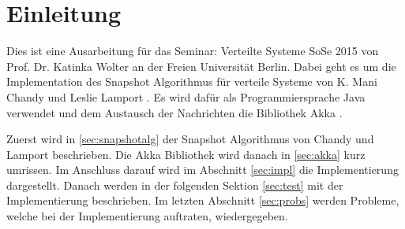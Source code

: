 \section{Einleitung}
\label{sec:einl}
Dies ist eine Ausarbeitung für das Seminar: Verteilte Systeme SoSe 2015 von Prof. Dr. Katinka Wolter an der Freien Universität Berlin.
Dabei geht es um die Implementation des Snapshot Algorithmus für verteile Systeme von K. Mani Chandy und Leslie Lamport \cite{snapshotChandyLamport}.
Es wird dafür als Programmiersprache Java \cite{java} verwendet und dem Austausch der Nachrichten die Bibliothek Akka \cite{akka}.

Zuerst wird in \ref{sec:snapshotalg} der Snapshot Algorithmus von Chandy und Lamport beschrieben.
Die Akka Bibliothek wird danach in \ref{sec:akka} kurz umrissen.
Im Anschluss darauf wird im Abschnitt \ref{sec:impl} die Implementierung dargestellt.
Danach werden in der folgenden Sektion \ref{sec:test} mit der Implementierung beschrieben.
Im letzten Abschnitt \ref{sec:probs} werden Probleme, welche bei der Implementierung auftraten, wiedergegeben.
